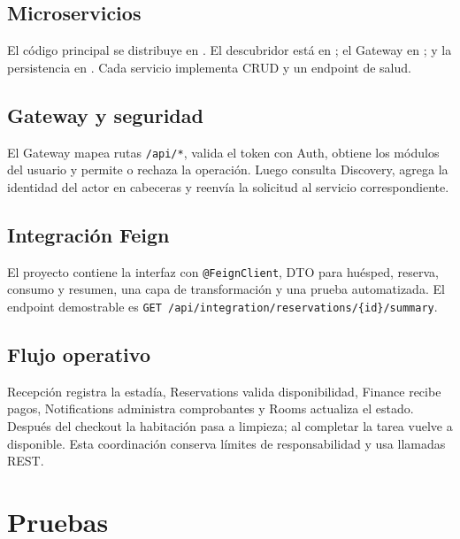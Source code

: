 \documentclass[12pt,a4paper]{article}
\begin{document}
\subsection{Microservicios}

El código principal se distribuye en . El descubridor está en ; el Gateway en ; y la persistencia en . Cada servicio implementa CRUD y un endpoint de salud.

\subsection{Gateway y seguridad}

El Gateway mapea rutas \texttt{/api/*}, valida el token con Auth, obtiene los módulos del usuario y permite o rechaza la operación. Luego consulta Discovery, agrega la identidad del actor en cabeceras y reenvía la solicitud al servicio correspondiente.

\subsection{Integración Feign}

El proyecto  contiene la interfaz  con \texttt{@FeignClient}, DTO para huésped, reserva, consumo y resumen, una capa de transformación y una prueba automatizada. El endpoint demostrable es \texttt{GET /api/integration/reservations/\{id\}/summary}.

\subsection{Flujo operativo}

Recepción registra la estadía, Reservations valida disponibilidad, Finance recibe pagos, Notifications administra comprobantes y Rooms actualiza el estado. Después del checkout la habitación pasa a limpieza; al completar la tarea vuelve a disponible. Esta coordinación conserva límites de responsabilidad y usa llamadas REST.

\section{Pruebas}
\end{document}
